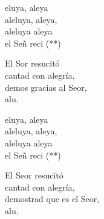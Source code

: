 \documentclass[12pt]{article}
\begin{document}
\begin{multicols*}{2}
\begin{cancion}%
	\begin{chorus}%
	eluya, aleya\\
	aleluya, aleya,\\
	aleluya aleya\\
	el Señ reci (**)  \\
	\end{chorus}%
	El Sor resucitó \\
cantad con alegría,\\
	demos gracias al Seor,\\
	alu.\\
	\begin{chorus}%
	eluya, aleya\\
	aleluya, aleya,\\
	aleluya aleya\\
	el Señ reci (**)  \\
	\end{chorus}%
	El Seor resucitó\\
cantad con alegría,\\
	demostrad que es el Seor,\\
	alu.\\
\end{cancion}%


\end{multicols*}
\end{document}
